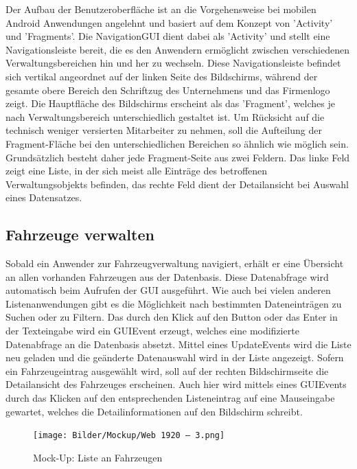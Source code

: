 Der Aufbau der Benutzeroberfläche ist an die Vorgehensweise bei mobilen Android Anwendungen angelehnt und basiert auf dem Konzept von 'Activity' und 'Fragments'. 
Die NavigationGUI dient dabei als 'Activity' und stellt eine Navigationsleiste bereit, die es den Anwendern ermöglicht zwischen verschiedenen Verwaltungsbereichen hin und her zu wechseln. 
Diese Navigationsleiste befindet sich vertikal angeordnet auf der linken Seite des Bildschirms, während der gesamte obere Bereich den Schriftzug des Unternehmens und das Firmenlogo zeigt. 
Die Hauptfläche des Bildschirms erscheint als das 'Fragment', welches je nach Verwaltungsbereich unterschiedlich gestaltet ist. 
Um Rücksicht auf die technisch weniger versierten Mitarbeiter zu nehmen, soll die Aufteilung der Fragment-Fläche bei den unterschiedlichen Bereichen so ähnlich wie möglich sein.
Grundsätzlich besteht daher jede Fragment-Seite aus zwei Feldern.
Das linke Feld zeigt eine Liste, in der sich meist alle Einträge des betroffenen Verwaltungsobjekts befinden, das rechte Feld dient der Detailansicht bei Auswahl eines Datensatzes. 

\subsection{Fahrzeuge verwalten}

Sobald ein Anwender zur Fahrzeugverwaltung navigiert, erhält er eine Übersicht an allen vorhanden Fahrzeugen aus der Datenbasis. 
Diese Datenabfrage wird automatisch beim Aufrufen der GUI ausgeführt. 
Wie auch bei vielen anderen Listenanwendungen gibt es die Möglichkeit nach bestimmten Dateneinträgen zu Suchen oder zu Filtern. 
Das durch den Klick auf den Button oder das Enter in der Texteingabe wird ein GUIEvent erzeugt, welches eine modifizierte Datenabfrage an die Datenbasis absetzt.
Mittel eines UpdateEvents wird die Liste neu geladen und die geänderte Datenauswahl wird in der Liste angezeigt. 
Sofern ein Fahrzeugeintrag ausgewählt wird, soll auf der rechten Bildschirmseite die Detailansicht des Fahrzeuges erscheinen. 
Auch hier wird mittels eines GUIEvents durch das Klicken auf den entsprechenden Listeneintrag auf eine Mauseingabe gewartet, welches die Detailinformationen auf den Bildschirm schreibt. 

\newpage

\begin{figure}[!ht]
    \centering
    \texttt{[image: Bilder/Mockup/Web 1920 – 3.png]}
    \caption{Mock-Up: Liste an Fahrzeugen}
    \label{mu:fahrzeugliste}
\end{figure}

